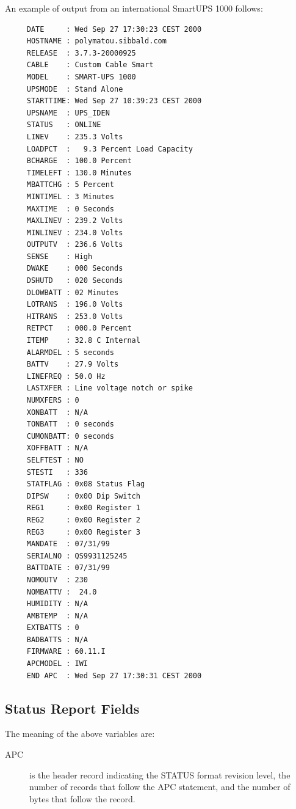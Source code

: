 {{{{{{{{{{{{{\label{index-Examples_002c-Status-Report-254}
\label{index-Status-255}
An example of output from an international SmartUPS 1000 follows: 

\footnotesize
\begin{verbatim}
     DATE     : Wed Sep 27 17:30:23 CEST 2000
     HOSTNAME : polymatou.sibbald.com
     RELEASE  : 3.7.3-20000925
     CABLE    : Custom Cable Smart
     MODEL    : SMART-UPS 1000
     UPSMODE  : Stand Alone
     STARTTIME: Wed Sep 27 10:39:23 CEST 2000
     UPSNAME  : UPS_IDEN
     STATUS   : ONLINE
     LINEV    : 235.3 Volts
     LOADPCT  :   9.3 Percent Load Capacity
     BCHARGE  : 100.0 Percent
     TIMELEFT : 130.0 Minutes
     MBATTCHG : 5 Percent
     MINTIMEL : 3 Minutes
     MAXTIME  : 0 Seconds
     MAXLINEV : 239.2 Volts
     MINLINEV : 234.0 Volts
     OUTPUTV  : 236.6 Volts
     SENSE    : High
     DWAKE    : 000 Seconds
     DSHUTD   : 020 Seconds
     DLOWBATT : 02 Minutes
     LOTRANS  : 196.0 Volts
     HITRANS  : 253.0 Volts
     RETPCT   : 000.0 Percent
     ITEMP    : 32.8 C Internal
     ALARMDEL : 5 seconds
     BATTV    : 27.9 Volts
     LINEFREQ : 50.0 Hz
     LASTXFER : Line voltage notch or spike
     NUMXFERS : 0
     XONBATT  : N/A
     TONBATT  : 0 seconds
     CUMONBATT: 0 seconds
     XOFFBATT : N/A
     SELFTEST : NO
     STESTI   : 336
     STATFLAG : 0x08 Status Flag
     DIPSW    : 0x00 Dip Switch
     REG1     : 0x00 Register 1
     REG2     : 0x00 Register 2
     REG3     : 0x00 Register 3
     MANDATE  : 07/31/99
     SERIALNO : QS9931125245
     BATTDATE : 07/31/99
     NOMOUTV  : 230
     NOMBATTV :  24.0
     HUMIDITY : N/A
     AMBTEMP  : N/A
     EXTBATTS : 0
     BADBATTS : N/A
     FIRMWARE : 60.11.I
     APCMODEL : IWI
     END APC  : Wed Sep 27 17:30:31 CEST 2000
\end{verbatim}
\normalsize

\label{Status-Report-Fields}

\subsection*{Status Report Fields}

\label{index-Status-256}
The meaning of the above variables are:  

\begin{description}

\item [APC]
   is the header record indicating the STATUS format revision level, the number
of records that follow the APC statement, and the number of bytes that follow
the record.  


\end{description}}}}}}}}}}}}}}
